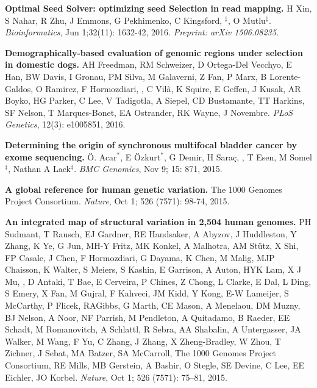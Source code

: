   \vspace{-.2cm}        
  {\bf Optimal Seed Solver: optimizing seed Selection in read mapping.}
  H Xin, S Nahar, R Zhu, J Emmons, G Pekhimenko, C Kingsford, \calkan{}$^\ddag$, O Mutlu$^\ddag$.
 {\em Bioinformatics}, Jun 1;32(11): 1632-42, 2016. \textit{Preprint: arXiv 1506.08235.}


  \vspace{-.2cm}        
  {\bf Demographically-based evaluation of genomic regions under selection in domestic dogs.}
AH Freedman, RM Schweizer, D Ortega-Del Vecchyo, E Han, BW Davis, I Gronau, PM Silva, M Galaverni, Z Fan, P Marx, B Lorente-Galdos, O Ramirez, F Hormozdiari, \calkan{}, C Vilà, K Squire, 
E Geffen, J Kusak, AR Boyko, HG Parker, C Lee, V Tadigotla, A Siepel, CD Bustamante, TT Harkins, SF Nelson, T Marques-Bonet, EA Ostrander, RK Wayne, J Novembre.
 {\em PLoS Genetics}, 12(3): e1005851, 2016.

  \vspace{-.2cm}        
  {\bf Determining the origin of synchronous multifocal bladder cancer by exome sequencing.} 
  Ö. Acar$^*$, E Özkurt$^*$, G Demir, H Saraç, \calkan{}, T Esen, M Somel$^\ddag$, Nathan A Lack$^\ddag$.
 {\em BMC Genomics}, Nov 9; 15: 871, 2015.

  \vspace{-.2cm}        
  {\bf A global reference for human genetic variation.} The 1000 Genomes Project Consortium.  {\em Nature}, Oct 1; 526 (7571): 98-74, 2015.

  \vspace{-.2cm}        
  {\bf An integrated map of structural variation in 2,504 human genomes.}
  PH Sudmant, T Rausch, EJ Gardner,  RE Handsaker, A Abyzov, J Huddleston, Y Zhang, K Ye, G Jun, MH-Y Fritz, MK Konkel, A Malhotra, AM Stütz, X Shi, FP Casale, J Chen, 
  F Hormozdiari, G Dayama, K Chen, M Malig, MJP Chaisson, K Walter, S Meiers, S Kashin, E Garrison, A Auton, HYK Lam, X J Mu, \calkan, D Antaki, T Bae, E Cerveira, P Chines, Z Chong, 
  L Clarke, E Dal, L Ding, S Emery, X Fan, M Gujral, F Kahveci, JM Kidd, Y Kong, E-W Lameijer, S McCarthy, P Flicek, RAGibbs, G Marth, CE Mason, A Menelaou, DM Muzny, 
  BJ Nelson, A Noor, NF Parrish, M Pendleton, A Quitadamo, B Raeder, EE Schadt, M Romanovitch, A Schlattl, R Sebra, AA Shabalin, A Untergasser, 
  JA Walker, M Wang, F Yu, C Zhang, J Zhang, X Zheng-Bradley, W Zhou, T Zichner, J Sebat, MA Batzer, SA McCarroll, 
  The 1000 Genomes Project Consortium, RE Mills, MB Gerstein, A Bashir, O Stegle, SE Devine, C Lee, EE Eichler, JO Korbel. 
  {\em Nature}, Oct 1; 526 (7571): 75–81, 2015.

